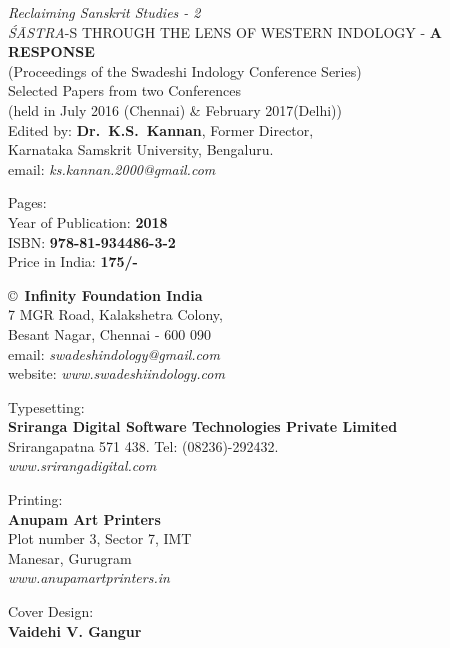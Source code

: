\thispagestyle{empty}
\noindent
{\fontsize{9}{11}\selectfont\sl Reclaiming Sanskrit Studies - 2}\\
{\sl ŚĀSTRA}-S THROUGH THE LENS OF WESTERN INDOLOGY - {\bfseries A RESPONSE}\\ 
(Proceedings of the Swadeshi Indology Conference Series)\\
Selected Papers from two Conferences\\ 
(held in July 2016 (Chennai) \& February 2017(Delhi))\\
Edited by: {\bf Dr.\ K.S.\ Kannan}, Former Director,\\ 
Karnataka Samskrit University, Bengaluru.\\
email: {\sl ks.kannan.2000@gmail.com}
\vfill

\noindent
Pages: {\bf\pageref{bookend}}\\
Year of Publication: {\bf 2018}\\
ISBN: {\bf 978-81-934486-3-2}\\
Price in India: {\bf 175/-}
\vfill

\noindent
\copyright\ {\bf Infinity Foundation India}\\ 
7 MGR Road, Kalakshetra Colony,\\ 
Besant Nagar, Chennai - 600 090\\
email: {\sl swadeshindology@gmail.com}\\
website: {\sl www.swadeshiindology.com} 
\vfill

\noindent
Typesetting:\\ 
{\bf Sriranga Digital Software Technologies Private Limited}\\ 
Srirangapatna 571 438. Tel: (08236)-292432.\\
{\sl www.srirangadigital.com}
\vfill

\noindent
Printing:\\
{\bf Anupam Art Printers}\\
Plot number 3, Sector 7, IMT\\
Manesar, Gurugram\\
{\sl www.anupamartprinters.in}
\noindent

\bigskip

Cover Design:\\ 
{\bf Vaidehi V. Gangur}

